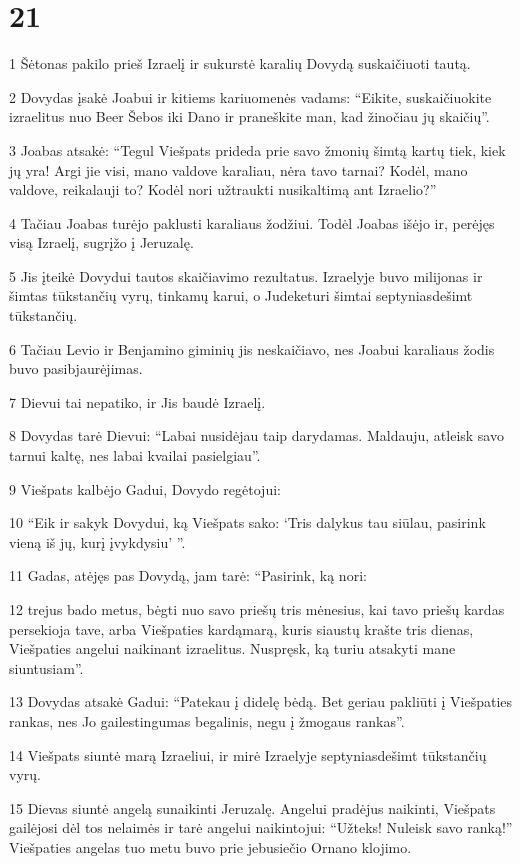 \chapter{21}

\par 1 Šėtonas pakilo prieš Izraelį ir sukurstė karalių Dovydą suskaičiuoti tautą. 
\par 2 Dovydas įsakė Joabui ir kitiems kariuomenės vadams: “Eikite, suskaičiuokite izraelitus nuo Beer Šebos iki Dano ir praneškite man, kad žinočiau jų skaičių”. 
\par 3 Joabas atsakė: “Tegul Viešpats prideda prie savo žmonių šimtą kartų tiek, kiek jų yra! Argi jie visi, mano valdove karaliau, nėra tavo tarnai? Kodėl, mano valdove, reikalauji to? Kodėl nori užtraukti nusikaltimą ant Izraelio?” 
\par 4 Tačiau Joabas turėjo paklusti karaliaus žodžiui. Todėl Joabas išėjo ir, perėjęs visą Izraelį, sugrįžo į Jeruzalę. 
\par 5 Jis įteikė Dovydui tautos skaičiavimo rezultatus. Izraelyje buvo milijonas ir šimtas tūkstančių vyrų, tinkamų karui, o Jude­keturi šimtai septyniasdešimt tūkstančių. 
\par 6 Tačiau Levio ir Benjamino giminių jis neskaičiavo, nes Joabui karaliaus žodis buvo pasibjaurėjimas. 
\par 7 Dievui tai nepatiko, ir Jis baudė Izraelį. 
\par 8 Dovydas tarė Dievui: “Labai nusidėjau taip darydamas. Maldauju, atleisk savo tarnui kaltę, nes labai kvailai pasielgiau”. 
\par 9 Viešpats kalbėjo Gadui, Dovydo regėtojui: 
\par 10 “Eik ir sakyk Dovydui, ką Viešpats sako: ‘Tris dalykus tau siūlau, pasirink vieną iš jų, kurį įvykdysiu’ ”. 
\par 11 Gadas, atėjęs pas Dovydą, jam tarė: “Pasirink, ką nori: 
\par 12 trejus bado metus, bėgti nuo savo priešų tris mėnesius, kai tavo priešų kardas persekioja tave, arba Viešpaties kardą­marą, kuris siaustų krašte tris dienas, Viešpaties angelui naikinant izraelitus. Nuspręsk, ką turiu atsakyti mane siuntusiam”. 
\par 13 Dovydas atsakė Gadui: “Patekau į didelę bėdą. Bet geriau pakliūti į Viešpaties rankas, nes Jo gailestingumas begalinis, negu į žmogaus rankas”. 
\par 14 Viešpats siuntė marą Izraeliui, ir mirė Izraelyje septyniasdešimt tūkstančių vyrų. 
\par 15 Dievas siuntė angelą sunaikinti Jeruzalę. Angelui pradėjus naikinti, Viešpats gailėjosi dėl tos nelaimės ir tarė angelui naikintojui: “Užteks! Nuleisk savo ranką!” Viešpaties angelas tuo metu buvo prie jebusiečio Ornano klojimo. 
